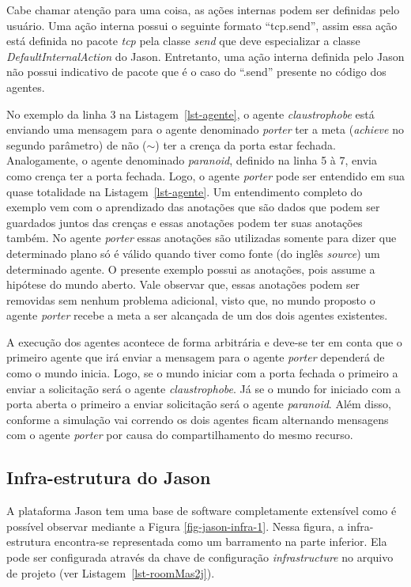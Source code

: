 Cabe chamar atenção para uma coisa, as ações internas podem ser definidas pelo
usuário. Uma ação interna possui o seguinte formato ``tcp.send'', assim essa
ação está definida no pacote \emph{tcp} pela classe \emph{send} que
deve especializar a classe \emph{DefaultInternalAction} do Jason.
Entretanto, uma ação interna definida pelo Jason não possui indicativo de
pacote que é o caso do ``.send'' presente no código dos agentes.

No exemplo da linha 3 na Listagem~\ref{lst-agente}, o agente
\emph{claustrophobe} está enviando uma mensagem para o agente denominado \emph{porter}
ter a meta (\emph{achieve} no segundo parâmetro) de não ($\sim$) ter a crença
da porta estar fechada. Analogamente, o agente denominado \emph{paranoid}, definido
na linha 5 à 7, envia como crença ter a porta fechada. Logo, o agente \emph{porter} pode ser entendido
em sua quase totalidade na Listagem~\ref{lst-agente}. Um entendimento completo
do exemplo vem com o aprendizado das anotações que são dados que podem
ser guardados juntos das crenças e essas anotações podem ter suas anotações também.
No agente \emph{porter} essas anotações são utilizadas somente
para dizer que determinado plano só é válido quando tiver como fonte 
(do inglês \emph{source}) um determinado agente. O presente exemplo possui
as anotações, pois assume a hipótese do mundo aberto. Vale observar que, essas
anotações podem ser removidas sem nenhum problema adicional, visto que, no
mundo proposto o agente \emph{porter} recebe a meta a ser alcançada de um dos
dois agentes existentes.

A execução dos agentes acontece de forma arbitrária e deve-se ter em conta
que o primeiro agente que irá enviar a mensagem para o agente \emph{porter} dependerá
de como o mundo inicia. Logo, se o mundo iniciar com a porta fechada o primeiro
a enviar a solicitação será o agente \emph{claustrophobe}. Já se o mundo for iniciado
com a porta aberta o primeiro a enviar solicitação será o agente \emph{paranoid}.
Além disso, conforme a simulação vai correndo os dois agentes ficam alternando
mensagens com o agente \emph{porter} por causa do compartilhamento do mesmo recurso.

\subsection{Infra-estrutura do Jason} \label{sec-jason-architecture}

A plataforma Jason tem uma base de software completamente extensível como
é possível observar mediante a Figura \ref{fig-jason-infra-1}.
Nessa figura, a infra-estrutura encontra-se representada como um barramento
na parte inferior. Ela pode ser configurada através da chave de configuração
\emph{infrastructure} no arquivo de projeto (ver Listagem~\ref{lst-roomMas2j}).

